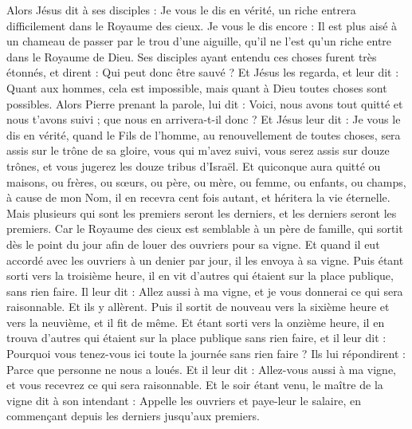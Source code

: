 \begin{multicols}{2}
Alors Jésus dit à ses disciples : Je vous le dis en vérité, un riche entrera difficilement dans le Royaume des cieux.
Je vous le dis encore : Il est plus aisé à un chameau de passer par le trou d'une aiguille, qu'il ne l'est qu'un riche entre dans le Royaume de Dieu.
Ses disciples ayant entendu ces choses furent très étonnés, et dirent : Qui peut donc être sauvé ?
Et Jésus les regarda, et leur dit : Quant aux hommes, cela est impossible, mais quant à Dieu toutes choses sont possibles.
Alors Pierre prenant la parole, lui dit : Voici, nous avons tout quitté et nous t'avons suivi ; que nous en arrivera-t-il donc ?
Et Jésus leur dit : Je vous le dis en vérité, quand le Fils de l'homme, au renouvellement de toutes choses, sera assis sur le trône de sa gloire, vous qui m'avez suivi, vous serez assis sur douze trônes, et vous jugerez les douze tribus d'Israël.
Et quiconque aura quitté ou maisons, ou frères, ou sœurs, ou père, ou mère, ou femme, ou enfants, ou champs, à cause de mon Nom, il en recevra cent fois autant, et héritera la vie éternelle.
Mais plusieurs qui sont les premiers seront les derniers, et les derniers seront les premiers.
\VerseOne{} Car le Royaume des cieux est semblable à un père de famille, qui sortit dès le point du jour afin de louer des ouvriers pour sa vigne.
Et quand il eut accordé avec les ouvriers à un denier par jour, il les envoya à sa vigne.
Puis étant sorti vers la troisième heure, il en vit d'autres qui étaient sur la place publique, sans rien faire.
Il leur dit : Allez aussi à ma vigne, et je vous donnerai ce qui sera raisonnable.
Et ils y allèrent. Puis il sortit de nouveau vers la sixième heure et vers la neuvième, et il fit de même.
Et étant sorti vers la onzième heure, il en trouva d'autres qui étaient sur la place publique sans rien faire, et il leur dit : Pourquoi vous tenez-vous ici toute la journée sans rien faire ?
Ils lui répondirent : Parce que personne ne nous a loués. Et il leur dit : Allez-vous aussi à ma vigne, et vous recevrez ce qui sera raisonnable.
Et le soir étant venu, le maître de la vigne dit à son intendant : Appelle les ouvriers et paye-leur le salaire, en commençant depuis les derniers jusqu'aux premiers.

\end{multicols}
